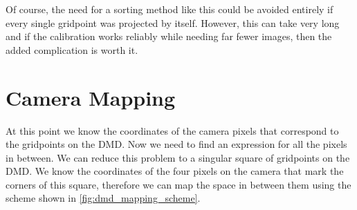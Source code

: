 Of course, the need for a sorting method like this could be avoided entirely if every single gridpoint was projected by itself. However, this can take very long and if the calibration works reliably while needing far fewer images, then the added complication is worth it.

\section{Camera Mapping}
\label{sec:dmd_mapping}
At this point we know the coordinates of the camera pixels that correspond to the gridpoints on the DMD. Now we need to find an expression for all the pixels in between. We can reduce this problem to a singular square of gridpoints on the DMD. We know the coordinates of the four pixels on the camera that mark the corners of this square, therefore we can map the space in between them using the scheme shown in \cref{fig:dmd_mapping_scheme}.

